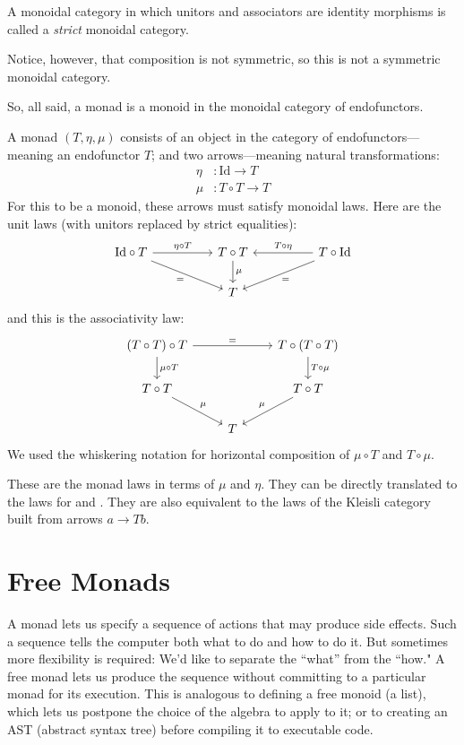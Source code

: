 \documentclass[DaoFP]{subfiles}
\begin{document}
A monoidal category in which unitors and associators are identity morphisms is called a \emph{strict} monoidal category.

Notice, however, that composition is not symmetric, so this is not a symmetric monoidal category.

So, all said, a monad is a monoid in the monoidal category of endofunctors. 

A monad $(T, \eta, \mu)$ consists of an object in the category of endofunctors---meaning an endofunctor $T$; and two arrows---meaning natural transformations:
\begin{align*}
 \eta &\colon \text{Id} \to T \\
 \mu &\colon T \circ T \to T 
\end{align*}
For this to be a monoid, these arrows must satisfy monoidal laws. Here are the unit laws (with unitors replaced by strict equalities):
\[
 \begin{tikzcd}
\text{Id} \circ T
 \arrow[rr, "\eta \circ T"]
 \arrow[rrd, "="']
& & T \circ T
 \arrow[d, "\mu"]
&& T \circ \text{Id}
 \arrow[ll, "T \circ \eta"']
 \arrow[lld, "="]
 \\
 && T
  \end{tikzcd}
\]
and this is the associativity law:
\[
 \begin{tikzcd}
 (T \circ T) \circ T 
 \arrow[rr, "="]
 \arrow[d, "\mu \circ T"]
 &&
 T \circ (T \circ T)
 \arrow[d, "T \circ \mu"]
 \\
 T \circ T 
 \arrow[dr, "\mu"]
& & T \circ T
 \arrow[dl, "\mu"']
 \\
&  T
 \end{tikzcd}
\]
We used the whiskering notation for horizontal composition of $\mu \circ T$ and $T \circ \mu$.

These are the monad laws in terms of $\mu$ and $\eta$. They can be directly translated to the laws for  and . They are also equivalent to the laws of the Kleisli category built from arrows $a \to T b$.

\section{Free Monads}

A monad lets us specify a sequence of actions that may produce side effects. Such a sequence tells the computer both what to do and how to do it. But sometimes more flexibility is required: We'd like to separate the ``what'' from the ``how." A free monad lets us produce the sequence without committing to a particular monad for its execution. This is analogous to defining a free monoid (a list), which lets us postpone the choice of the algebra to apply to it; or to creating an AST (abstract syntax tree) before compiling it to executable code.
\end{document}
